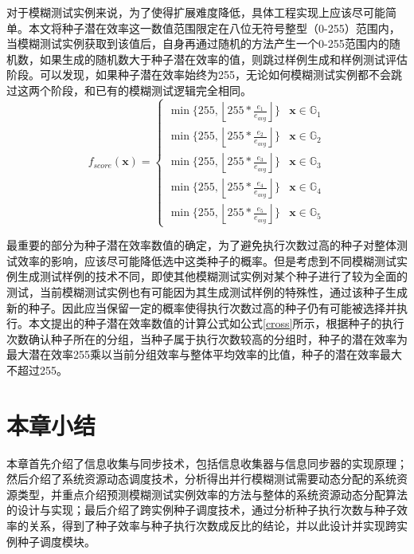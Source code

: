 \documentclass[master]{thesis-uestc}
\begin{document}
对于模糊测试实例来说，为了使得扩展难度降低，具体工程实现上应该尽可能简单。本文将种子潜在效率这一数值范围限定在八位无符号整型（0-255）范围内，当模糊测试实例获取到该值后，自身再通过随机的方法产生一个0-255范围内的随机数，如果生成的随机数大于种子潜在效率的值，则跳过样例生成和样例测试评估阶段。可以发现，如果种子潜在效率始终为255，无论如何模糊测试实例都不会跳过这两个阶段，和已有的模糊测试逻辑完全相同。
\begin{equation}
    f_{score}(\bm{x})=
    \begin{cases}
    \min\{255, \left\lfloor  255 * \frac{e_1}{e_{avg}} \right\rfloor\} & \bm{x} \in \mathbb{G}_1 \\
    \min\{255, \left\lfloor  255 * \frac{e_2}{e_{avg}} \right\rfloor\} & \bm{x} \in \mathbb{G}_2 \\
    \min\{255, \left\lfloor  255 * \frac{e_3}{e_{avg}} \right\rfloor\} & \bm{x} \in \mathbb{G}_3 \\
    \min\{255, \left\lfloor  255 * \frac{e_4}{e_{avg}} \right\rfloor\} & \bm{x} \in \mathbb{G}_4 \\
    \min\{255, \left\lfloor  255 * \frac{e_5}{e_{avg}} \right\rfloor\} & \bm{x} \in \mathbb{G}_5 
    \end{cases}
    \label{cross}
\end{equation}

最重要的部分为种子潜在效率数值的确定，为了避免执行次数过高的种子对整体测试效率的影响，应该尽可能降低选中这类种子的概率。但是考虑到不同模糊测试实例生成测试样例的技术不同，即使其他模糊测试实例对某个种子进行了较为全面的测试，当前模糊测试实例也有可能因为其生成测试样例的特殊性，通过该种子生成新的种子。因此应当保留一定的概率使得执行次数过高的种子仍有可能被选择并执行。本文提出的种子潜在效率数值的计算公式如公式\ref{cross}所示，根据种子的执行次数确认种子所在的分组，当种子属于执行次数较高的分组时，种子的潜在效率为最大潜在效率255乘以当前分组效率与整体平均效率的比值，种子的潜在效率最大不超过255。


\section{本章小结}

本章首先介绍了信息收集与同步技术，包括信息收集器与信息同步器的实现原理；然后介绍了系统资源动态调度技术，分析得出并行模糊测试需要动态分配的系统资源类型，并重点介绍预测模糊测试实例效率的方法与整体的系统资源动态分配算法的设计与实现；最后介绍了跨实例种子调度技术，通过分析种子执行次数与种子效率的关系，得到了种子效率与种子执行次数成反比的结论，并以此设计并实现跨实例种子调度模块。 
\end{document}
